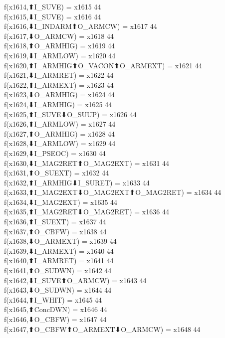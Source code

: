 f(x1614,⬆I_SUVE) = x1615 {44} \\
f(x1615,⬇I_SUVE) = x1616 {44} \\
f(x1616,⬇I_INDARM⬆O_ARMCW) = x1617 {44} \\
f(x1617,⬇O_ARMCW) = x1618 {44} \\
f(x1618,⬆O_ARMHIG) = x1619 {44} \\
f(x1619,⬇I_ARMLOW) = x1620 {44} \\
f(x1620,⬆I_ARMHIG⬆O_VACON⬆O_ARMEXT) = x1621 {44} \\
f(x1621,⬇I_ARMRET) = x1622 {44} \\
f(x1622,⬆I_ARMEXT) = x1623 {44} \\
f(x1623,⬇O_ARMHIG) = x1624 {44} \\
f(x1624,⬇I_ARMHIG) = x1625 {44} \\
f(x1625,⬆I_SUVE⬇O_SUUP) = x1626 {44} \\
f(x1626,⬆I_ARMLOW) = x1627 {44} \\
f(x1627,⬆O_ARMHIG) = x1628 {44} \\
f(x1628,⬇I_ARMLOW) = x1629 {44} \\
f(x1629,⬇I_PSEOC) = x1630 {44} \\
f(x1630,⬇I_MAG2RET⬆O_MAG2EXT) = x1631 {44} \\
f(x1631,⬆O_SUEXT) = x1632 {44} \\
f(x1632,⬆I_ARMHIG⬇I_SURET) = x1633 {44} \\
f(x1633,⬆I_MAG2EXT⬇O_MAG2EXT⬆O_MAG2RET) = x1634 {44} \\
f(x1634,⬇I_MAG2EXT) = x1635 {44} \\
f(x1635,⬆I_MAG2RET⬇O_MAG2RET) = x1636 {44} \\
f(x1636,⬆I_SUEXT) = x1637 {44} \\
f(x1637,⬆O_CBFW) = x1638 {44} \\
f(x1638,⬇O_ARMEXT) = x1639 {44} \\
f(x1639,⬇I_ARMEXT) = x1640 {44} \\
f(x1640,⬆I_ARMRET) = x1641 {44} \\
f(x1641,⬆O_SUDWN) = x1642 {44} \\
f(x1642,⬇I_SUVE⬆O_ARMCW) = x1643 {44} \\
f(x1643,⬇O_SUDWN) = x1644 {44} \\
f(x1644,⬆I_WHIT) = x1645 {44} \\
f(x1645,⬆ConcDWN) = x1646 {44} \\
f(x1646,⬇O_CBFW) = x1647 {44} \\
f(x1647,⬆O_CBFW⬆O_ARMEXT⬇O_ARMCW) = x1648 {44} \\
